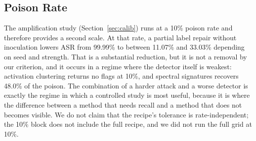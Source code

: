 \subsection{Poison Rate}
The amplification study (Section~\ref{sec:calib}) runs at a 10\% poison rate and
therefore provides a second scale. At that rate, a partial label repair without
inoculation lowers ASR from 99.99\% to between 11.07\% and 33.03\% depending on
seed and strength. That is a substantial reduction, but it is not a removal by
our criterion, and it occurs in a regime where the detector itself is weakest:
activation clustering returns no flags at 10\%, and spectral signatures recovers
48.0\% of the poison. The combination of a harder attack and a worse detector is
exactly the regime in which a controlled study is most useful, because it is
where the difference between a method that needs recall and a method that does
not becomes visible. We do not claim that the recipe's tolerance is
rate-independent; the 10\% block does not include the full recipe, and we did not
run the full grid at 10\%.
